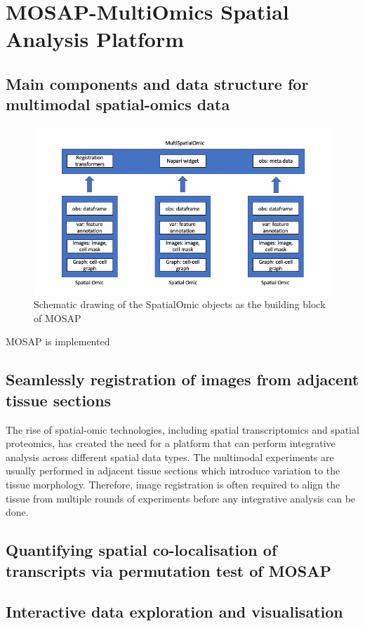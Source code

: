 
\section{MOSAP-MultiOmics Spatial Analysis Platform}
\subsection{Main components and data structure for multimodal spatial-omics data}
\begin{figure}
    \centering
    \includegraphics[width=0.8\columnwidth]{Chapter4/Figures/Chap4_MOSAP_OOP.png}
    \caption[Schematic drawing of the SpatialOmic objects as the building block of MOSAP]{Schematic drawing of the SpatialOmic objects as the building block of MOSAP}
    \label{Chap4:MOSAP_OOP}
\end{figure}
MOSAP is implemented 
\subsection{Seamlessly registration of images from adjacent tissue sections}
The rise of spatial-omic technologies, including spatial transcriptomics and spatial proteomics, has created the need for a platform that can perform integrative analysis across different spatial data types. The multimodal experiments are usually performed in adjacent tissue sections which introduce variation to the tissue morphology. Therefore, image registration is often required to align the tissue from multiple rounds of experiments before any integrative analysis can be done.  
\subsection{Quantifying spatial co-localisation of transcripts via permutation test of MOSAP}
\subsection{Interactive data exploration and visualisation}

